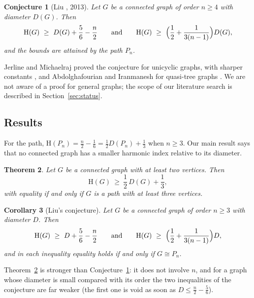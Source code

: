 \documentclass[11pt]{article}
\newtheorem{theorem}{Theorem}[section]
\newtheorem{corollary}[theorem]{Corollary}
\newtheorem{conjecture}[theorem]{Conjecture}
\theoremstyle{definition}
\theoremstyle{remark}
\newcommand{\Hm}{\mathrm{H}}
\newcommand{\D}{D}
\begin{document}
\begin{conjecture}[Liu \cite{Liu}, 2013]\label{conj:liu}
Let $G$ be a connected graph of order $n\ge4$ with diameter $\D(G)$. Then
\[
 \Hm(G)\ \ge\ \D(G)+\frac56-\frac n2
 \qquad\text{and}\qquad
 \Hm(G)\ \ge\ \Bigl(\frac12+\frac1{3(n-1)}\Bigr)\D(G) ,
\]
and the bounds are attained by the path $P_n$.
\end{conjecture}

Jerline and Michaelraj proved the conjecture for unicyclic graphs, with sharper constants
\cite{JM1,JM2}, and Abdolghafourian and Iranmanesh for quasi-tree graphs \cite{AI}. We are
not aware of a proof for general graphs; the scope of our literature search is described in
Section~\ref{sec:status}.

\subsection{Results}
For the path, $\Hm(P_n)=\frac n2-\frac16=\frac12\D(P_n)+\frac13$ when $n\ge3$. Our main
result says that no connected graph has a smaller harmonic index relative to its diameter.

\begin{theorem}\label{thm:main}
Let $G$ be a connected graph with at least two vertices. Then
\[
 \Hm(G)\ \ge\ \frac12\,\D(G)+\frac13 ,
\]
with equality if and only if $G$ is a path with at least three vertices.
\end{theorem}

\begin{corollary}[Liu's conjecture]\label{cor:liu}
Let $G$ be a connected graph of order $n\ge3$ with diameter $\D$. Then
\[
 \Hm(G)\ \ge\ \D+\frac56-\frac n2
 \qquad\text{and}\qquad
 \Hm(G)\ \ge\ \Bigl(\frac12+\frac1{3(n-1)}\Bigr)\D ,
\]
and in each inequality equality holds if and only if $G\cong P_n$.
\end{corollary}

Theorem~\ref{thm:main} is stronger than Conjecture~\ref{conj:liu}: it does not involve $n$,
and for a graph whose diameter is small compared with its order the two inequalities of the
conjecture are far weaker (the first one is void as soon as $\D\le \frac n2-\frac56$).
\end{document}
